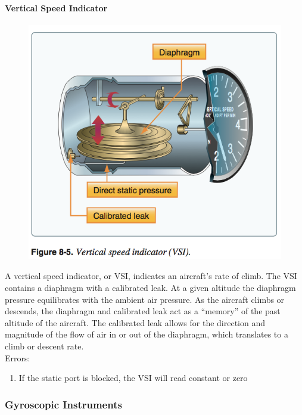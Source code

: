 \documentclass[12pt]{article}
\begin{document}
			\paragraph{Vertical Speed Indicator}
				\begin{figure}[H]
					\centering
					\includegraphics[width=0.5\linewidth]{Figures/VSI.png}
				\end{figure}
				A vertical speed indicator, or VSI, indicates an aircraft's rate of climb. The VSI contains a diaphragm with a calibrated leak. At a given altitude the diaphragm pressure equilibrates with the ambient air pressure. As the aircraft climbs or descends, the diaphragm and calibrated leak act as a ``memory'' of the past altitude of the aircraft. The calibrated leak allows for the direction and magnitude of the flow of air in or out of the diaphragm, which translates to a climb or descent rate.\\
				Errors:
					\begin{enumerate}
						\item If the static port is blocked, the VSI will read constant or zero
					\end{enumerate}
		\subsubsection{Gyroscopic Instruments}
\end{document}
